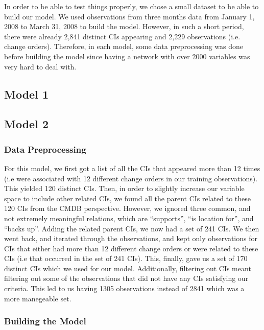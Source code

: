\documentclass{article}
\begin{document}
In order to be able to test things properly, we chose a small dataset to be able to build our model. We used observations from three months data from January 1,
2008 to March 31, 2008 to build the model. However, in such a short period, there were already 2,841 distinct CIs appearing and 2,229 observations (i.e. change
orders). Therefore, in each model, some data preprocessing was done before building the model since having a network with over 2000 variables was very hard to
deal with.

\subsection{Model 1}
\label{sec:model1}


\subsection{Model 2}
\label{sec:model2}

\subsubsection*{Data Preprocessing}

For this model, we first got a list of all the CIs that appeared more than 12 times (i.e were associated with 12 different change orders in our training
observations). This yielded 120 distinct CIs. Then, in order to slightly increase our variable space to include other related CIs, we found all the parent CIs
related to these 120 CIs from the CMDB perspective. However, we ignored three common, and not extremely meaningful relations, which are  ``supports'', ``is
location for'', and ``backs up''. Adding the related parent CIs, we now had a set of 241 CIs. We then went back, and iterated through the observations, and
kept only observations for CIs that either had more than 12 different change orders or were related to these CIs (i.e that occurred in the set of 241 CIs).
This, finally, gave us a set of 170 distinct CIs which we used for our model. Additionally, filtering out CIs meant filtering out some of the observations that
did not have any CIs satisfying our criteria. This led to us having 1305 observations instead of 2841 which was a more manegeable set.

\subsubsection*{Building the Model}
\end{document}
